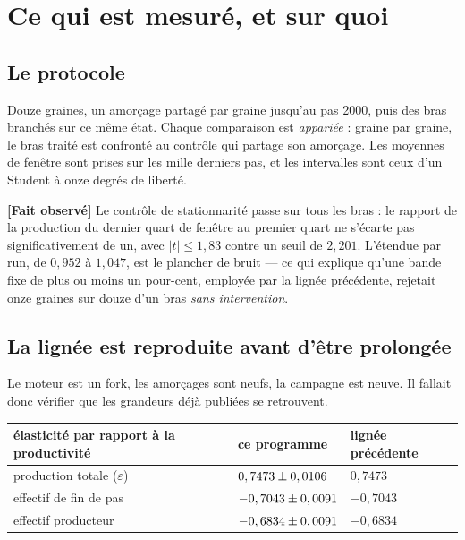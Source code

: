 \documentclass[11pt,a4paper]{article}
\newcommand{\fait}{\textbf{[Fait observé]}}
\begin{document}
\tableofcontents

\section{Ce qui est mesuré, et sur quoi}

\subsection{Le protocole}

Douze graines, un amorçage partagé par graine jusqu'au pas 2000, puis des
bras branchés sur ce même état. Chaque comparaison est \emph{appariée} :
graine par graine, le bras traité est confronté au contrôle qui partage son
amorçage. Les moyennes de fenêtre sont prises sur les mille derniers pas, et
les intervalles sont ceux d'un Student à onze degrés de liberté.

\fait{} Le contrôle de stationnarité passe sur tous les bras : le rapport de
la production du dernier quart de fenêtre au premier quart ne s'écarte pas
significativement de un, avec $|t| \le 1{,}83$ contre un seuil de $2{,}201$.
L'étendue par run, de $0{,}952$ à $1{,}047$, est le plancher de bruit --- ce
qui explique qu'une bande fixe de plus ou moins un pour-cent, employée par la
lignée précédente, rejetait onze graines sur douze d'un bras \emph{sans
intervention}.

\subsection{La lignée est reproduite avant d'être prolongée}

Le moteur est un fork, les amorçages sont neufs, la campagne est neuve. Il
fallait donc vérifier que les grandeurs déjà publiées se retrouvent.

\begin{longtable}{@{}p{}p{}p{}@{}}
\toprule
\textbf{élasticité par rapport à la productivité} & \textbf{ce programme} &
\textbf{lignée précédente} \\
\midrule
\endhead
production totale ($\varepsilon$) & $0,7473 \pm 0,0106$ & $0{,}7473$ \\
effectif de fin de pas & $-0,7043 \pm 0,0091$ & $-0{,}7043$ \\
effectif producteur & $-0,6834 \pm 0,0091$ & $-0{,}6834$ \\
\bottomrule
\end{longtable}
\end{document}
